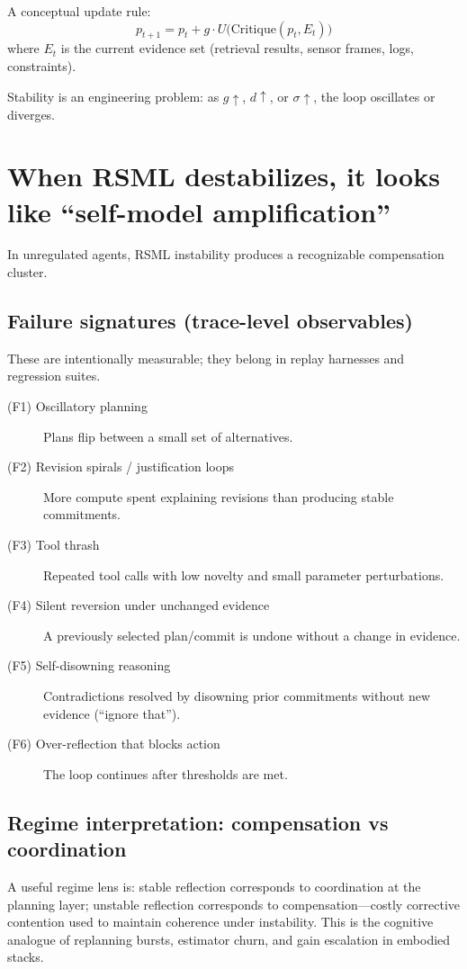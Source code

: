 \documentclass[11pt]{article}
\begin{document}
A conceptual update rule:
\[
p_{t+1} = p_t + g \cdot U\big(\text{Critique}(p_t, E_t)\big)
\]
where $E_t$ is the current evidence set (retrieval results, sensor frames, logs, constraints).

Stability is an engineering problem: as $g \uparrow$, $d \uparrow$, or $\sigma \uparrow$, the loop oscillates or diverges.

\section{When RSML destabilizes, it looks like ``self-model amplification''}
In unregulated agents, RSML instability produces a recognizable compensation cluster.

\subsection{Failure signatures (trace-level observables)}
These are intentionally measurable; they belong in replay harnesses and regression suites.

\begin{description}
  \item[(F1) Oscillatory planning] Plans flip between a small set of alternatives.
  \item[(F2) Revision spirals / justification loops] More compute spent explaining revisions than producing stable commitments.
  \item[(F3) Tool thrash] Repeated tool calls with low novelty and small parameter perturbations.
  \item[(F4) Silent reversion under unchanged evidence] A previously selected plan/commit is undone without a change in evidence.
  \item[(F5) Self-disowning reasoning] Contradictions resolved by disowning prior commitments without new evidence (\enquote{ignore that}).
  \item[(F6) Over-reflection that blocks action] The loop continues after thresholds are met.
\end{description}

\subsection{Regime interpretation: compensation vs coordination}
A useful regime lens is: stable reflection corresponds to coordination at the planning layer; unstable reflection
corresponds to compensation—costly corrective contention used to maintain coherence under instability. This
is the cognitive analogue of replanning bursts, estimator churn, and gain escalation in embodied stacks.
\end{document}
